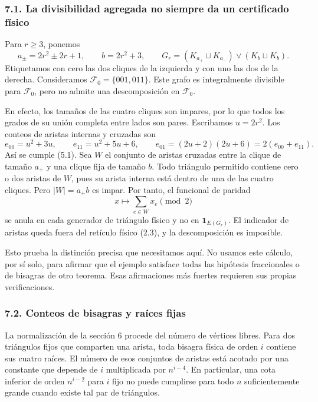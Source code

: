 \documentclass[spanish,11pt,a4paper]{article}
\begin{document}
\subsubsection{7.1. La divisibilidad agregada no siempre da un certificado físico}\label{la-divisibilidad-agregada-no-siempre-da-un-certificado-fuxedsico}

Para \(r\ge3\), ponemos \[a_\pm=2r^2\pm2r+1,\qquad b=2r^2+3,
\qquad G_r=(K_{a_+}\sqcup K_{a_-})\vee(K_b\sqcup K_b).
\tag{7.1}\] Etiquetamos con cero las dos cliques de la izquierda y con uno las dos de la derecha. Consideramos \(\mathcal F_0=\{001,011\}\). Este grafo es integralmente divisible para \(\mathcal F_0\), pero no admite una descomposición en \(\mathcal F_0\).

En efecto, los tamaños de las cuatro cliques son impares, por lo que todos los grados de su unión completa entre lados son pares. Escribamos \(u=2r^2\). Los conteos de aristas internas y cruzadas son \[e_{00}=u^2+3u,\qquad e_{11}=u^2+5u+6,
\qquad e_{01}=(2u+2)(2u+6)=2(e_{00}+e_{11}).
\tag{7.2}\] Así se cumple (5.1). Sea \(W\) el conjunto de aristas cruzadas entre la clique de tamaño \(a_+\) y una clique fija de tamaño \(b\). Todo triángulo permitido contiene cero o dos aristas de \(W\), pues su arista interna está dentro de una de las cuatro cliques. Pero \(|W|=a_+b\) es impar. Por tanto, el funcional de paridad \[x\longmapsto\sum_{e\in W}x_e\pmod2
\tag{7.3}\] se anula en cada generador de triángulo físico y no en \(\mathbf1_{E(G_r)}\). El indicador de aristas queda fuera del retículo físico (2.3), y la descomposición es imposible.

Esto prueba la distinción precisa que necesitamos aquí. No usamos este cálculo, por sí solo, para afirmar que el ejemplo satisface todas las hipótesis fraccionales o de bisagras de otro teorema. Esas afirmaciones más fuertes requieren sus propias verificaciones.

\subsubsection{7.2. Conteos de bisagras y raíces fijas}\label{conteos-de-bisagras-y-rauxedces-fijas}

La normalización de la sección 6 procede del número de vértices libres. Para dos triángulos fijos que comparten una arista, toda bisagra física de orden \(i\) contiene sus cuatro raíces. El número de esos conjuntos de aristas está acotado por una constante que depende de \(i\) multiplicada por \(n^{i-4}\). En particular, una cota inferior de orden \(n^{i-2}\) para \(i\) fijo no puede cumplirse para todo \(n\) suficientemente grande cuando existe tal par de triángulos.
\end{document}
